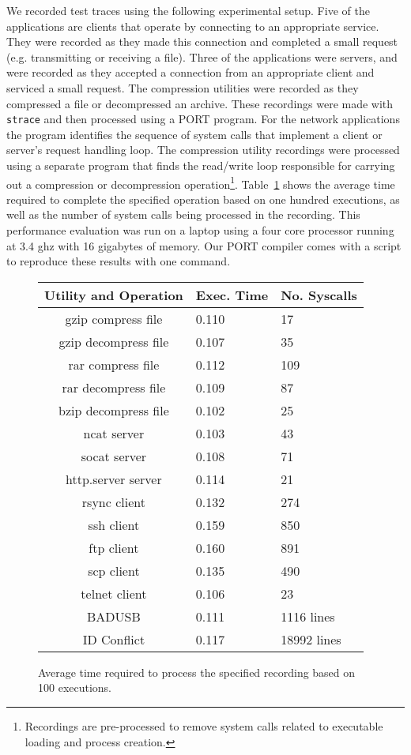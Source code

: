 We recorded test traces using the following
experimental setup. Five of the applications are clients that operate by connecting to an appropriate service. They were recorded as they made this connection and completed a small request (e.g. transmitting or receiving a file).
Three of the applications were servers, and were recorded as they accepted a connection from an appropriate client and serviced a small request.
The compression utilities were recorded as they compressed a file or decompressed an archive.
These recordings were made with {\tt strace}
and then processed using a PORT program.
For the network applications the program
identifies the sequence of system calls that implement
a client or server's request handling loop.
The compression utility recordings were processed using a separate
program that finds the read/write loop responsible for
carrying out a compression or decompression operation\footnote{Recordings are pre-processed to remove system calls
related to executable loading and process creation.}.  Table~\ref{tbl:RealWorldPerformance}
shows the average time required to complete the specified operation
based on one hundred executions, as well as the number of system calls being processed in the recording.  This performance evaluation was run on a laptop using a four core processor running at 3.4 ghz with 16 gigabytes of memory.
Our PORT compiler comes with a script to reproduce these results with one command.

\begin{figure}[H]
\centering
\begin{tabular}{|c|l|l}
Utility and Operation & Exec. Time & No. Syscalls \\
              \hline
gzip compress file   & 0.110           & 17  \\
gzip decompress file & 0.107           & 35  \\
rar compress file    & 0.112           & 109 \\
rar decompress file  & 0.109           & 87  \\
bzip decompress file & 0.102           & 25  \\
ncat server          & 0.103           & 43  \\
socat server         & 0.108           & 71  \\
http.server server   & 0.114           & 21  \\
rsync client         & 0.132           & 274 \\
ssh client           & 0.159           & 850 \\
ftp client           & 0.160           & 891 \\
scp client           & 0.135           & 490 \\
telnet client        & 0.106           & 23  \\
\hline
BADUSB               & 0.111           & 1116 lines \\
ID Conflict          & 0.117           & 18992 lines \\
\end{tabular}
\caption[PORT Perfomance]{Average time required to process the specified recording based on 100 executions.}
\label{tbl:RealWorldPerformance}
\end{figure}


